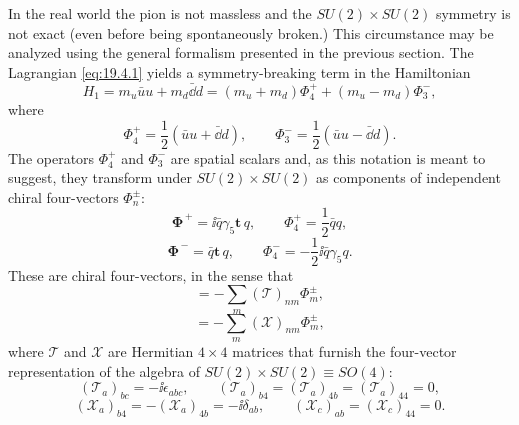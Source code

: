 In the real world the pion is not massless and the $SU(2)\times SU(2)$ symmetry is not exact (even before being spontaneously broken.) This circumstance may be analyzed using the general formalism presented in the previous section. The Lagrangian \eqref{eq:19.4.1} yields a symmetry-breaking term in the Hamiltonian
\begin{equation}
H_1=m_u\bar u u+m_d\bar \dd d
=(m_u+m_d)\Phi_4^+
+(m_u-m_d)\Phi_3^-,
\tag{19.4.34}\label{eq:19.4.34}
\end{equation}
where
\begin{equation}
\Phi_4^+=\frac12(\bar u u+\bar \dd d),
\qquad
\Phi_3^-=\frac12(\bar u u-\bar \dd d).
\tag{19.4.35}\label{eq:19.4.35}
\end{equation}
The operators $\Phi_4^+$ and $\Phi_3^-$ are spatial scalars and, as this notation is meant to suggest, they transform under $SU(2)\times SU(2)$ as components of independent chiral four-vectors $\Phi_n^\pm$:
\begin{equation}
\boldsymbol{\Phi}^{\, +}=\ii\bar q\gamma_5\mathbf{t}\,q,
\qquad
\Phi_4^+=\frac12\bar q q,
\tag{19.4.36}\label{eq:19.4.36}
\end{equation}
\begin{equation}
\boldsymbol{\Phi}^{\, -}=\bar q\mathbf{t}\,q,
\qquad
\Phi_4^-=-\frac12\ii\bar q\gamma_5q.
\tag{19.4.37}\label{eq:19.4.37}
\end{equation}
These are chiral four-vectors, in the sense that
\begin{equation}
[\mathbf{T},\Phi_n^\pm]
=-\sum_m(\mathbf{\mathcal T})_{nm}\Phi_m^\pm,
\tag{19.4.38}\label{eq:19.4.38}
\end{equation}
\begin{equation}
[\mathbf{X},\Phi_n^\pm]
=-\sum_m(\mathbf{\mathcal X})_{nm}\Phi_m^\pm,
\tag{19.4.39}\label{eq:19.4.39}
\end{equation}
where $\mathbf{\mathcal T}$ and $\mathbf{\mathcal X}$ are Hermitian $4\times4$ matrices that furnish the four-vector representation of the algebra of $SU(2)\times SU(2)\equiv SO(4)$:
\begin{equation}
(\mathcal T_a)_{bc}=-\ii\epsilon_{abc},
\qquad
(\mathcal T_a)_{b4}=(\mathcal T_a)_{4b}
=(\mathcal T_a)_{44}=0,
\tag{19.4.40}\label{eq:19.4.40}
\end{equation}
\begin{equation}
(\mathcal X_a)_{b4}=-(\mathcal X_a)_{4b}=-\ii\delta_{ab},
\qquad
(\mathcal X_c)_{ab}=(\mathcal X_c)_{44}=0.
\tag{19.4.41}\label{eq:19.4.41}
\end{equation}

